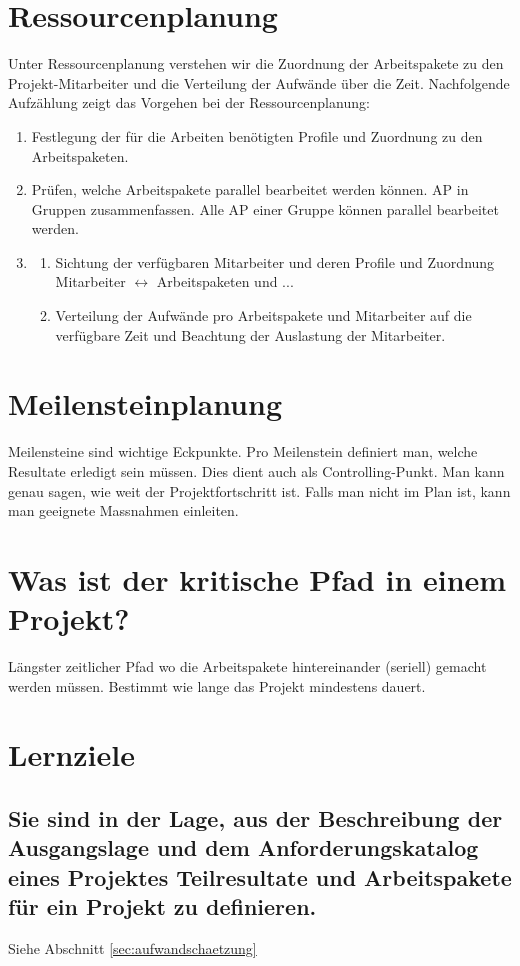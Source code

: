 \section{Ressourcenplanung}
\label{sec:ressourcenplanung}
Unter Ressourcenplanung verstehen wir die Zuordnung der Arbeitspakete zu den Projekt-Mitarbeiter und die Verteilung der Aufwände über die Zeit. Nachfolgende Aufzählung zeigt das Vorgehen bei der Ressourcenplanung:
\begin{enumerate}
	\item Festlegung der für die Arbeiten benötigten Profile und Zuordnung zu den Arbeitspaketen.
	\item Prüfen, welche Arbeitspakete parallel bearbeitet werden können. AP in Gruppen zusammenfassen. Alle AP einer Gruppe können parallel bearbeitet werden.
	\item 
	\begin{enumerate}
		\item Sichtung der verfügbaren Mitarbeiter und deren Profile und Zuordnung Mitarbeiter $\leftrightarrow$ Arbeitspaketen und ...
		\item Verteilung der Aufwände pro Arbeitspakete und Mitarbeiter auf die verfügbare Zeit und Beachtung der Auslastung der Mitarbeiter.
	\end{enumerate}
\end{enumerate}

\section{Meilensteinplanung}
\label{sec:meilensteinplanung}
Meilensteine sind wichtige Eckpunkte. Pro Meilenstein definiert man, welche Resultate erledigt sein müssen. Dies dient auch als Controlling-Punkt. Man kann genau sagen, wie weit der Projektfortschritt ist. Falls man nicht im Plan ist, kann man geeignete Massnahmen einleiten.

\section{Was ist der kritische Pfad in einem Projekt?}
Längster zeitlicher Pfad wo die Arbeitspakete hintereinander (seriell) gemacht werden müssen. Bestimmt wie lange das Projekt mindestens dauert.


\section{Lernziele}

\subsection{Sie sind in der Lage, aus der Beschreibung der Ausgangslage und dem Anforderungskatalog eines Projektes Teilresultate und Arbeitspakete für ein Projekt zu definieren.}
Siehe Abschnitt \ref{sec:aufwandschaetzung}

